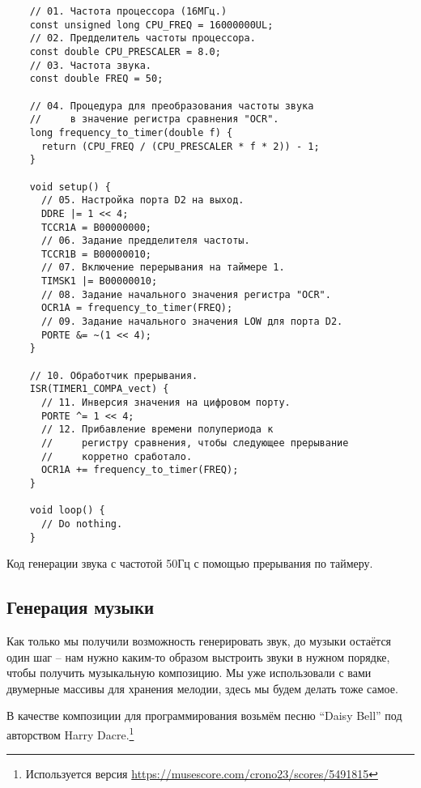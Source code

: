 \documentclass[../sparc.tex]{subfiles}
\begin{document}
\newpage
\begin{listing}[H]
  \begin{verbatim}
    // 01. Частота процессора (16МГц.)
    const unsigned long CPU_FREQ = 16000000UL;
    // 02. Предделитель частоты процессора.
    const double CPU_PRESCALER = 8.0;
    // 03. Частота звука.
    const double FREQ = 50;

    // 04. Процедура для преобразования частоты звука
    //     в значение регистра сравнения "OCR".
    long frequency_to_timer(double f) {
      return (CPU_FREQ / (CPU_PRESCALER * f * 2)) - 1;
    }

    void setup() {
      // 05. Настройка порта D2 на выход.
      DDRE |= 1 << 4;
      TCCR1A = B00000000;
      // 06. Задание предделителя частоты.
      TCCR1B = B00000010;
      // 07. Включение перерывания на таймере 1.
      TIMSK1 |= B00000010;
      // 08. Задание начального значения регистра "OCR".
      OCR1A = frequency_to_timer(FREQ);
      // 09. Задание начального значения LOW для порта D2.
      PORTE &= ~(1 << 4);
    }

    // 10. Обработчик прерывания.
    ISR(TIMER1_COMPA_vect) {
      // 11. Инверсия значения на цифровом порту.
      PORTE ^= 1 << 4;
      // 12. Прибавление времени полупериода к
      //     регистру сравнения, чтобы следующее прерывание
      //     корретно сработало.
      OCR1A += frequency_to_timer(FREQ);
    }

    void loop() {
      // Do nothing.
    }
  \end{verbatim}
  \caption{Код генерации звука с частотой 50Гц с помощью прерывания по таймеру.}
  \label{listing:mcu-music-2}
\end{listing}

\newpage
\subsection{Генерация музыки}
\label{subsection:mcu-music-1}

Как только мы получили возможность генерировать звук, до музыки остаётся один
шаг -- нам нужно каким-то образом выстроить звуки в нужном порядке, чтобы
получить музыкальную композицию.  Мы уже использовали с вами двумерные массивы
для хранения мелодии, здесь мы будем делать тоже самое.

В качестве композиции для программирования возьмём песню ``Daisy Bell'' под
авторством Harry Dacre.\footnote{Используется версия
\url{https://musescore.com/crono23/scores/5491815}}
\end{document}
